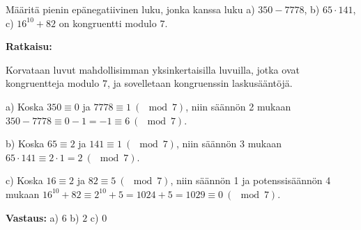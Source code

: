 \begin{esimerkki}
Määritä pienin epänegatiivinen luku, jonka kanssa luku a) $350 - 7778$, b) $65 \cdot 141$, c) $16^{10} + 82$ on kongruentti modulo $7$.

{\bf Ratkaisu:}

Korvataan luvut mahdollisimman yksinkertaisilla luvuilla, jotka ovat kongruentteja modulo $7$, ja sovelletaan kongruenssin laskusääntöjä.

a)
Koska $350 \equiv 0$ ja $7778 \equiv 1 \ (\mod 7)$, niin säännön 2 mukaan $350 - 7778 \equiv 0 - 1 = -1 \equiv 6 \ (\mod 7)$.

b)
Koska $65 \equiv 2$ ja $141 \equiv 1 \ (\mod 7)$, niin säännön 3 mukaan $65 \cdot 141 \equiv 2 \cdot 1 = 2 \ (\mod 7)$.

c)
Koska $16 \equiv 2$ ja $82 \equiv 5 \ (\mod 7)$, niin säännön 1 ja potenssisäännön 4 mukaan
$16^{10} + 82 \equiv 2^{10} + 5 = 1024 + 5 = 1029 \equiv 0 \ (\mod 7)$.

{\bf Vastaus:} a) $6$ b) $2$ c) $0$
\end{esimerkki}

